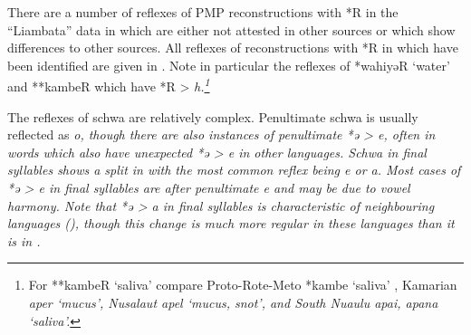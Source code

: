 \newpage
There are a number of reflexes of PMP reconstructions with *R
in the ``Liambata'' data in \citet{Tauern1931} which are either not
attested in other sources or which show differences to other sources.
All reflexes of reconstructions with *R in \citet{Tauern1931}
which have been identified are given in .
Note in particular the reflexes of *wahiyəR ‘water’
and **kambeR which have *R > \it{h}.\footnote{
		For **kambeR ‘saliva’ compare Proto-Rote-Meto
		*kambe ‘saliva’ \citep[192]{Edwards2021},
		Kamarian \it{aper} ‘mucus’, Nusalaut \it{apel} ‘mucus,
		snot’, and South Nuaulu \it{apai},
		\it{apana} ‘saliva’.}
\\


The reflexes of schwa are relatively complex.
Penultimate schwa is usually reflected as \it{o},
though there are also instances of penultimate *ə > \it{e},
often in words which also have unexpected *ə > \it{e} in other  languages.
Schwa in final syllables shows a split in  with the most
common reflex being \it{e} or \it{a}.
Most cases of *ə > \it{e} in final syllables are after penultimate
\it{e} and may be due to vowel harmony.
Note that *ə > \it{a} in final syllables is characteristic of
neighbouring  languages (),
though this change is much more regular in these 
languages than it is in .

